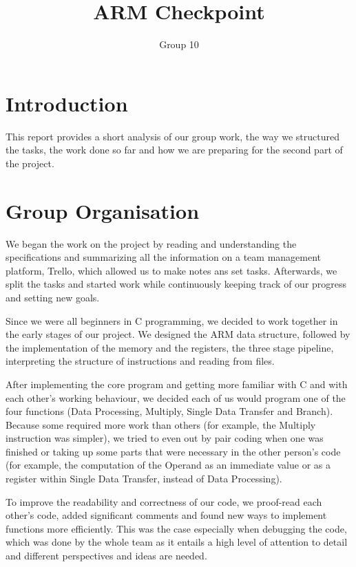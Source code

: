 \documentclass[11pt]{article}
\begin{document}
\title{ARM Checkpoint }
\author{Group 10}

\maketitle

\section{Introduction} 
This report provides a short analysis of our group work, the way we structured the tasks, the work done so far and how we are preparing for the second part of the project.

\section{Group Organisation}
We began the work on the project by reading and understanding the specifications and summarizing all the information on a team management platform, Trello, which allowed us to make notes ans set tasks. Afterwards, we split the tasks and started work while continuously keeping track of our progress and setting new goals.  \\ \par \noindent
Since we were all beginners in C programming, we decided to work together in the early stages of our project. We designed the ARM data structure, followed by the implementation of the memory and the registers, the three stage pipeline, interpreting the structure of instructions and reading from files. \\ \par \noindent
After implementing the core program and getting more familiar with C and with each other’s working behaviour, we decided each of us would program one of the four functions (Data Processing, Multiply, Single Data Transfer and Branch). Because some required more work than others (for example, the Multiply instruction was simpler), we tried to even out by pair coding when one was finished or taking up some parts that were necessary in the other person's code (for example, the computation of the Operand as an immediate value or as a register within Single Data Transfer, instead of Data Processing). \\ \par \noindent
To improve the readability and correctness of our code, we proof-read each other's code, added significant comments and found new ways to implement functions more efficiently. This was the case especially when debugging the code, which was done by the whole team as it entails a high level of attention to detail and different perspectives and ideas are needed. \\ \par \noindent
\end{document}
